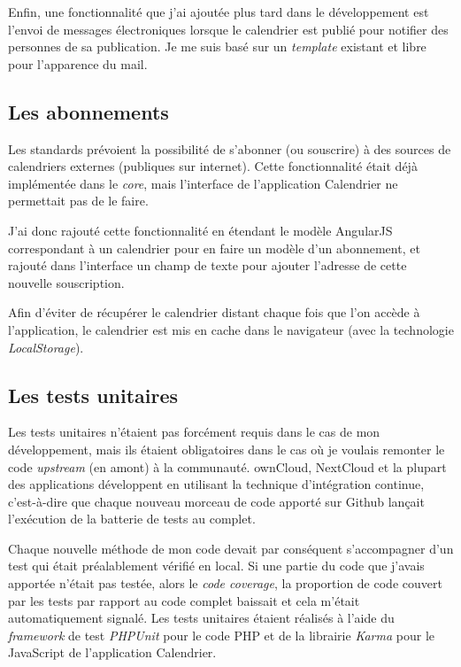 \documentclass[10pt,a4paper, twoside]{report}
\begin{document}
	Enfin, une fonctionnalité que j'ai ajoutée plus tard dans le développement est l'envoi de messages électroniques lorsque le calendrier est publié pour notifier des personnes de sa publication. Je me suis basé sur un \textit{template} existant et libre pour l'apparence du mail.
	
	\subsection{Les abonnements}
	Les standards prévoient la possibilité de s'abonner (ou souscrire) à des sources de calendriers externes (publiques sur internet). Cette fonctionnalité était déjà implémentée dans le \textit{core}, mais l'interface de l'application Calendrier ne permettait pas de le faire. 
	
	J'ai donc rajouté cette fonctionnalité en étendant le modèle AngularJS correspondant à un calendrier pour en faire un modèle d'un abonnement, et rajouté dans l'interface un champ de texte pour ajouter l'adresse de cette nouvelle souscription. 
	
	Afin d'éviter de récupérer le calendrier distant chaque fois que l'on accède à l'application, le calendrier est mis en cache dans le navigateur (avec la technologie \textit{LocalStorage}).
	
	\subsection{Les tests unitaires}
	Les tests unitaires n'étaient pas forcément requis dans le cas de mon développement, mais ils étaient obligatoires dans le cas où je voulais remonter le code \textit{upstream} (en amont) à la communauté. ownCloud, NextCloud et la plupart des applications développent en utilisant la technique d'intégration continue, c'est-à-dire que chaque nouveau morceau de code apporté sur Github lançait l'exécution de la batterie de tests au complet. 
	
	Chaque nouvelle méthode de mon code devait par conséquent s'accompagner d'un test qui était préalablement vérifié en local. Si une partie du code que j'avais apportée n'était pas testée, alors le \textit{code coverage}, la proportion de code couvert par les tests par rapport au code complet baissait et cela m'était automatiquement signalé. Les tests unitaires étaient réalisés à l'aide du \textit{framework} de test \textit{PHPUnit} pour le code PHP et de la librairie \textit{Karma} pour le JavaScript de l'application Calendrier.
	
\end{document}
